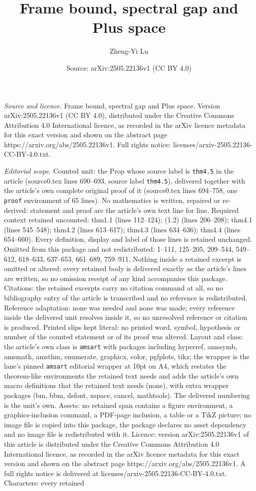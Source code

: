 \documentclass[10pt,a4paper]{amsart}
\title[Frame bound, spectral gap and Plus space]{Frame bound, spectral gap and Plus space}
\author{Zheng-Yi Lu}
\date{Source: arXiv:2505.22136v1 (CC BY 4.0)}
\begin{document}
\maketitle

\noindent\emph{Source and licence.} Frame bound, spectral gap and Plus space. Version arXiv:2505.22136v1 (CC BY 4.0), distributed under the Creative Commons Attribution 4.0 International licence, as recorded in the arXiv licence metadata for this exact version and shown on the abstract page https://arxiv.org/abs/2505.22136v1. Full rights notice: licenses/arxiv-2505.22136-CC-BY-4.0.txt.\par\smallskip

\noindent\textit{Editorial scope.} Counted unit: the Prop whose source label is \texttt{thm4.5} in the article (source0.tex lines 690--693, source label \texttt{thm4.5}), delivered together with the article's own complete original proof of it (source0.tex lines 694--758, one \texttt{proof} environment of 65 lines). No mathematics is written, repaired or re-derived: statement and proof are the article's own text line for line. Required context retained uncounted: thm1.1 (lines 112--124); (1.2) (lines 206--208); thm4.1 (lines 545--548); thm4.2 (lines 613--617); thm4.3 (lines 634--636); thm4.4 (lines 654--660). Every definition, display and label of those lines is retained unchanged. Omitted from this package and not redistributed: 1--111, 125--205, 209--544, 549--612, 618--633, 637--653, 661--689, 759--911. Nothing inside a retained excerpt is omitted or altered: every retained body is delivered exactly as the article's lines are written, so no omission receipt of any kind accompanies this package. Citations: the retained excerpts carry no citation command at all, so no bibliography entry of the article is transcribed and no reference is redistributed. Reference adaptation: none was needed and none was made; every reference inside the delivered unit resolves inside it, so no unresolved reference or citation is produced. Printed slips kept literal: no printed word, symbol, hypothesis or number of the counted statement or of its proof was altered. Layout and class: the article's own class is \texttt{amsart} with packages including hyperref, amssymb, amsmath, amsthm, enumerate, graphicx, color, pgfplots, tikz; the wrapper is the lane's pinned \texttt{amsart} editorial wrapper at 10pt on A4, which restates the theorem-like environments the retained text needs and adds the article's own macro definitions that the retained text needs (none), with extra wrapper packages (bm, bbm, dsfont, xspace, cancel, mathtools). The delivered numbering is the unit's own. Assets: no retained span contains a figure environment, a graphics-inclusion command, a PDF-page inclusion, a table or a TikZ picture; no image file is copied into this package, the package declares no asset dependency and no image file is redistributed with it. Licence: version arXiv:2505.22136v1 of this article is distributed under the Creative Commons Attribution 4.0 International licence, as recorded in the arXiv licence metadata for this exact version and shown on the abstract page https://arxiv.org/abs/2505.22136v1. A full rights notice is delivered at licenses/arxiv-2505.22136-CC-BY-4.0.txt. Characters: every retained 
\end{document}
